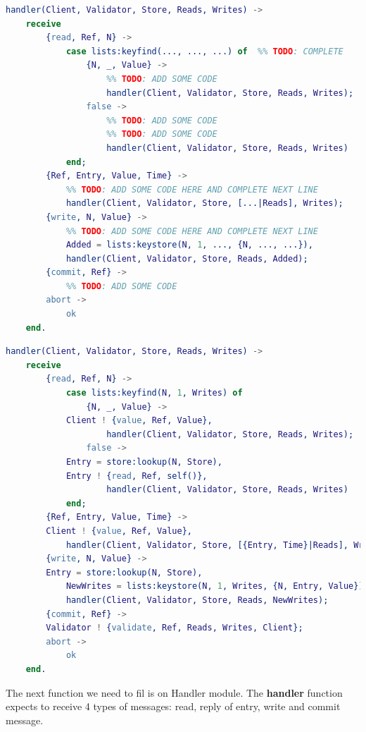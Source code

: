 \documentclass[a4paper, 10pt]{article}
\begin{document}
  \begin{minipage}{.45\textwidth}
	\begin{lstlisting}[language=erlang, caption={Template}]
handler(Client, Validator, Store, Reads, Writes) ->         
    receive
        {read, Ref, N} ->
            case lists:keyfind(..., ..., ...) of  %% TODO: COMPLETE
                {N, _, Value} ->
                    %% TODO: ADD SOME CODE
                    handler(Client, Validator, Store, Reads, Writes);
                false ->
                    %% TODO: ADD SOME CODE
                    %% TODO: ADD SOME CODE
                    handler(Client, Validator, Store, Reads, Writes)
            end;
        {Ref, Entry, Value, Time} ->
            %% TODO: ADD SOME CODE HERE AND COMPLETE NEXT LINE
            handler(Client, Validator, Store, [...|Reads], Writes);
        {write, N, Value} ->
            %% TODO: ADD SOME CODE HERE AND COMPLETE NEXT LINE
            Added = lists:keystore(N, 1, ..., {N, ..., ...}),
            handler(Client, Validator, Store, Reads, Added);
        {commit, Ref} ->
            %% TODO: ADD SOME CODE
        abort ->
            ok
    end.
 	\end{lstlisting}
    \end{minipage}\hfill
    \begin{minipage}{.45\textwidth}
	\begin{lstlisting}[language=erlang, caption={Filled version}]
handler(Client, Validator, Store, Reads, Writes) ->         
    receive
        {read, Ref, N} ->
            case lists:keyfind(N, 1, Writes) of  
                {N, _, Value} ->
		    Client ! {value, Ref, Value},
                    handler(Client, Validator, Store, Reads, Writes);
                false ->
		    Entry = store:lookup(N, Store),
		    Entry ! {read, Ref, self()},
                    handler(Client, Validator, Store, Reads, Writes)
            end;
        {Ref, Entry, Value, Time} ->
	    Client ! {value, Ref, Value},
            handler(Client, Validator, Store, [{Entry, Time}|Reads], Writes);
        {write, N, Value} ->
	    Entry = store:lookup(N, Store),
            NewWrites = lists:keystore(N, 1, Writes, {N, Entry, Value}),
            handler(Client, Validator, Store, Reads, NewWrites);
        {commit, Ref} ->
	    Validator ! {validate, Ref, Reads, Writes, Client};
        abort ->
            ok
    end.
  	\end{lstlisting}
  \end{minipage}

The next function we need to fil is on Handler module. The \textbf{handler} function expects to receive 4 types of messages: read, reply of entry, write and commit message.
\end{document}
